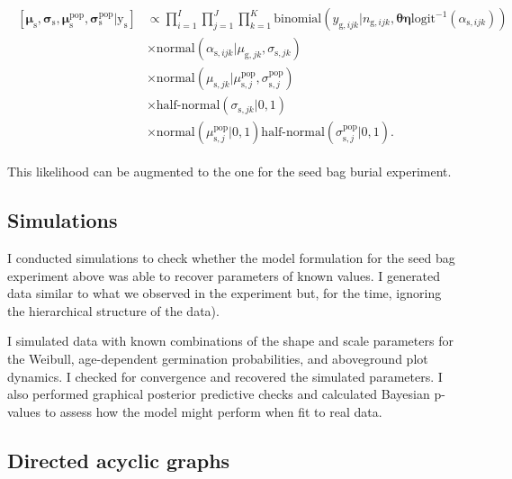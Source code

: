 \documentclass[12pt, oneside, titlepage]{article}   	%
\begin{document}
\begin{align}
  \begin{split}
     [ \bm{\mu}_\mathrm{s} , \bm{\sigma}_\mathrm{s} , \bm{\mu}_\mathrm{s}^\mathrm{pop}, \bm{\sigma}_\mathrm{s}^\mathrm{pop} |  \bm{\mathrm{y}}_\mathrm{s}  ] & \propto \prod_{i=1}^{I} \prod_{j=1}^{J} \prod_{k=1}^{K} \mathrm{binomial} ( y_{\mathrm{g},ijk} | n_{\mathrm{g},ijk}, \bm{\theta} \bm{\eta}  \mathrm{logit}^{-1}(\alpha_{\mathrm{s},ijk})  )
             \\ & \times \mathrm{normal} ( \alpha_{\mathrm{s},ijk}  | \mu_{\mathrm{g},jk}, \sigma{_{\mathrm{s},jk} })
  \\ & \times \mathrm{normal} ( \mu_{\mathrm{s},jk}  | \mu^\mathrm{pop}_{\mathrm{s},j}, \sigma^\mathrm{pop}_{\mathrm{s},j} )
  \\ & \times \textrm{half-normal} ( \sigma_{\mathrm{s},jk} | 0,1)
  \\ & \times \mathrm{normal} ( \mu^\mathrm{pop}_{\mathrm{s},j} | 0 , 1 ) \textrm{half-normal} ( \sigma^\mathrm{pop}_{\mathrm{s},j} | 0,1).
  \end{split}
\end{align}

This likelihood can be augmented to the one for the seed bag burial experiment. 

\subsection{Simulations}

I conducted simulations to check whether the model formulation for the seed bag experiment above was able to recover parameters of known values. I generated data similar to what we observed in the experiment but, for the time, ignoring the hierarchical structure of the data).

I simulated data with known combinations of the shape and scale parameters for the Weibull, age-dependent germination probabilities, and aboveground plot dynamics. I checked for convergence and recovered the simulated parameters. I also performed graphical posterior predictive checks and calculated Bayesian p-values to assess how the model might perform when fit to real data. 

\clearpage
\newpage

\subsection{Directed acyclic graphs}
\end{document}
